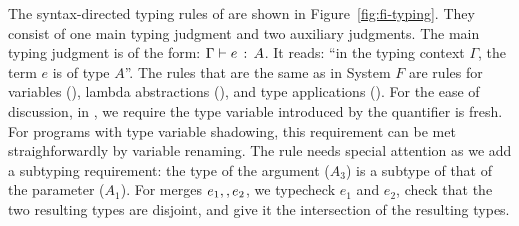 The syntax-directed typing rules of \name are shown in
Figure~\ref{fig:fi-typing}. They consist of one main typing judgment and two
auxiliary judgments. The main typing judgment is of the form: $ \Gamma \vdash e \ \!:\! \ A $. It reads: ``in the typing context $\Gamma$, the term $e$ is of type
$A$''. The rules that are the same as in System $F$ are rules for variables
(), lambda abstractions (), and type applications
(). For the ease of discussion, in , we require
the type variable introduced by the quantifier is fresh. For programs with type
variable shadowing, this requirement can be met straighforwardly by variable
renaming. The rule  needs special attention as we add a subtyping
requirement: the type of the argument ($A_3$) is a subtype of that of the
parameter ($A_1$).
For merges $e_1 ,, e_2$, we typecheck $e_1$ and $e_2$, check that the two
resulting types are disjoint, and give it the intersection of the resulting
types.

